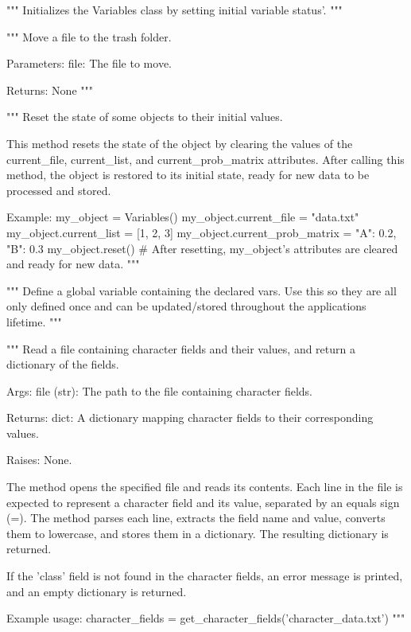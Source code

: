 \begin{codebox}
"""
Initializes the Variables class by setting initial variable status'.
"""
\end{codebox}

\begin{codebox}
"""
Move a file to the trash folder.

Parameters:
    file: The file to move.
    
Returns: 
    None
"""
\end{codebox}

\begin{codebox}
"""
Reset the state of some objects to their initial values.

This method resets the state of the object by clearing the values of the current_file, current_list,
and current_prob_matrix attributes. After calling this method, the object is restored to its initial
state, ready for new data to be processed and stored.

Example:
    my_object = Variables()
    my_object.current_file = "data.txt"
    my_object.current_list = [1, 2, 3]
    my_object.current_prob_matrix = {"A": 0.2, "B": 0.3}
    my_object.reset()
    # After resetting, my_object's attributes are cleared and ready for new data.
"""
\end{codebox}

\begin{codebox}[global\_vars = Variables()]
"""
Define a global variable containing the declared vars. Use this so they are all only defined once and can be updated/stored throughout the applications lifetime.
"""
\end{codebox}

\begin{codebox}
"""
Read a file containing character fields and their values, and return a dictionary of the fields.

Args:
    file (str): The path to the file containing character fields.

Returns:
    dict: A dictionary mapping character fields to their corresponding values.

Raises:
    None.

The method opens the specified file and reads its contents. Each line in the file is expected to
represent a character field and its value, separated by an equals sign (=). The method parses each
line, extracts the field name and value, converts them to lowercase, and stores them in a dictionary.
The resulting dictionary is returned.

If the 'class' field is not found in the character fields, an error message is printed, and an
empty dictionary is returned.

Example usage:
    character_fields = get_character_fields('character_data.txt')
"""
\end{codebox}

